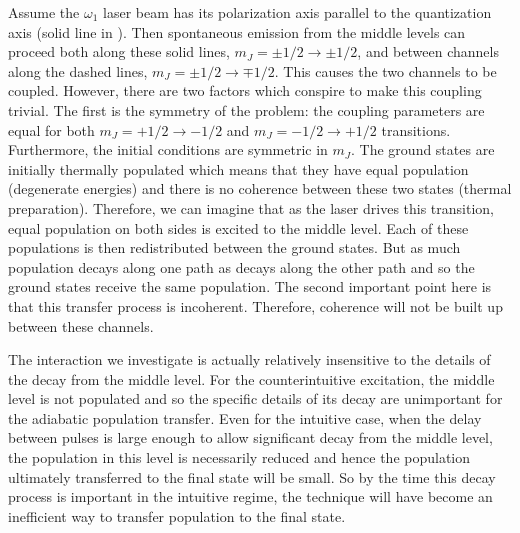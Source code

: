 Assume the $\omega_1$ laser beam has its polarization axis parallel to the
quantization axis (solid line in ).  Then spontaneous emission
from the middle levels can proceed both along these solid lines, $m_J = \pm 1/2
\rightarrow \pm 1/2$, and between channels along the dashed lines, $m_J = \pm
1/2 \rightarrow \mp 1/2$.  This causes the two channels to be coupled. 
However, there are two factors which conspire to make this coupling
trivial.  The first is the symmetry of the problem: the coupling
parameters are equal for both $m_J = + 1/2 \rightarrow - 1/2$ and $m_J = -1/2
\rightarrow + 1/2$ transitions.  Furthermore, the initial conditions are
symmetric in $m_J$.  The ground states are initially thermally populated
which means that they have equal population (degenerate energies) and there is no
coherence between these two states (thermal preparation).  Therefore, we can
imagine that as the laser drives this transition, equal population on both sides
is excited to the middle level.  Each of these populations is then
redistributed between the ground states.  But as much population decays
along one path as decays along the other path and so the ground states receive
the same population.  The second important point here is that this transfer
process is incoherent.  Therefore, coherence will not be built up between
these channels.  

The interaction we investigate is actually relatively insensitive to the
details of the decay from the middle level.  For the counterintuitive
excitation, the middle level is not populated and so the specific details of
its decay are unimportant for the adiabatic population transfer.  Even for the
intuitive case, when the delay between pulses is large enough to allow
significant decay from the middle level, the population in this level is
necessarily reduced and hence the population ultimately
transferred to the final state will be small.  So by the time this decay process
is important in the intuitive regime, the technique will have become an
inefficient way to transfer population to the final state.

